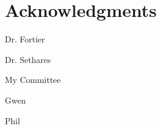 \documentclass{umthesis}
\begin{document}
\chapter*{Acknowledgments}             %
  Dr. Fortier
  
  Dr. Sethares
  
  My Committee
  
  Gwen
  
  Phil
  



\cleardoublepage
{}




\clearpage
\tableofcontents				 %
\clearpage
{}
{}
\listoffigures                  %



\mainmatter   %



\def \spo2{ \texorpdfstring{SpO$_{2}$}{SpO2}}


\raggedright











\begin{appendices}

\end{appendices}

\backmatter  %




%


\end{document}
